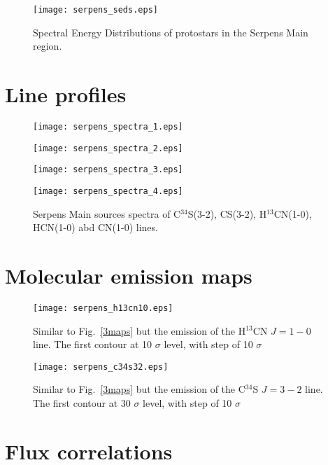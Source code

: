 \documentclass{aa}
\begin{document}
\begin{appendix}
\begin{figure}
   \texttt{[image: serpens\_seds.eps]}
      \caption{Spectral Energy Distributions of protostars in the Serpens Main region.}
         \label{seds}
   \end{figure}


\section{Line profiles}

\begin{figure*}
   \centering
   \texttt{[image: serpens\_spectra\_1.eps]}
         \label{Spectra_1}
   \end{figure*}
\begin{figure*}
   \centering
   \texttt{[image: serpens\_spectra\_2.eps]}
         \label{Spectra_1}
   \end{figure*}
\begin{figure*}
   \centering
   \texttt{[image: serpens\_spectra\_3.eps]}
         \label{Spectra_1}
   \end{figure*}
\begin{figure*}
   \centering
   \texttt{[image: serpens\_spectra\_4.eps]}
      \caption{Serpens Main sources spectra of C$^{34}$S(3-2), CS(3-2), H$^{13}$CN(1-0), HCN(1-0) abd CN(1-0) lines.}
         \label{Spectra_1}
   \end{figure*}

\section{Molecular emission maps}

\begin{figure}
\texttt{[image: serpens\_h13cn10.eps]}
\caption{Similar to Fig.~\ref{3maps} but the emission of the H$^{13}$CN $J=1-0$ line. The first contour at 10 $\sigma$ level, with step of 10 $\sigma$}
\label{h13cn10}
\end{figure}


\begin{figure}
\texttt{[image: serpens\_c34s32.eps]}
\caption{Similar to Fig.~\ref{3maps} but the emission of the C$^{34}$S $J=3-2$ line. The first contour at 30 $\sigma$ level, with step of 10 $\sigma$}
\label{c34s32}
\end{figure}


\section{Flux correlations}


\end{appendix}
\end{document}
